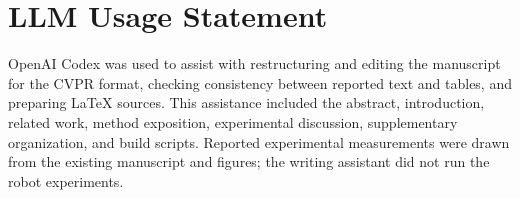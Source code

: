 \section*{LLM Usage Statement}
OpenAI Codex was used to assist with restructuring and editing the manuscript for the CVPR format, checking consistency between reported text and tables, and preparing LaTeX sources. This assistance included the abstract, introduction, related work, method exposition, experimental discussion, supplementary organization, and build scripts. Reported experimental measurements were drawn from the existing manuscript and figures; the writing assistant did not run the robot experiments.
